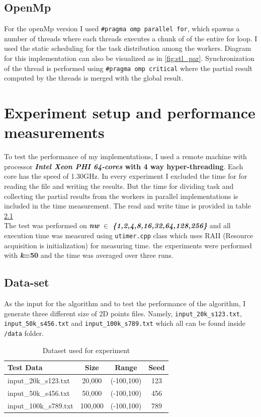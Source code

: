 \documentclass[12pt,a4paper]{report}
\begin{document}
\section{OpenMp}
For the openMp version I used \verb!#pragma omp parallel for!, which spawns a number of threads where each threads executes a chunk of of the entire for loop. I used the static scheduling for the task distribution among the workers. Diagram for this implementation can also be visualized as in \ref{fig:stl_par}. Synchronization of the thread is performed using \verb!#pragma omp critical! where the partial result computed by the threads is merged with the global result.
\chapter{Experiment setup and performance measurements}

To test the performance of my implementations, I used a remote machine with processor \textbf{\textit{Intel Xeon PHI 64-cores } with 4 way hyper-threading}. Each core has the speed of 1.30GHz. In every experiment I excluded the time for for reading the file and writing the results. But the time for dividing task and collecting the partial results from the workers in parallel implementations is included in the time measurement. The read and write time is provided in table \ref{readwritetime} \\

The test was  performed on \textit{\textbf{nw}} $\in$ \textbf{\textit{\{1,2,4,8,16,32,64,128,256\}}} and all execution time was measured using \verb!utimer.cpp! class which uses RAII (Resource acquisition is initialization) for measuring time. the experiments were performed with \textbf{\textit{k}=50} and the time was averaged over three runs.
\section{Data-set}
As the input for the algorithm and to test the performance of the algorithm, I generate three different size of 2D points files. Namely, \verb!input_20k_s123.txt!, \verb!input_50k_s456.txt! and \verb!input_100k_s789.txt! which all can be found inside \verb!/data! folder.
\begin{table}[htp]
  \begin{center}
    \begin{tabular}{l c c c} %
      Test Data & Size & Range & Seed  \\
      \midrule
      input\_20k\_s123.txt  & 20,000 & (-100,100) & 123 \\
      input\_50k\_s456.txt  & 50,000 & (-100,100) & 456 \\
      input\_100k\_s789.txt & 100,000 & (-100,100) & 789 \\
      \bottomrule
    \end{tabular}
    \caption{Dataset used for experiment}
    \label{readwritetime}
  \end{center}
\end{table}
\end{document}
